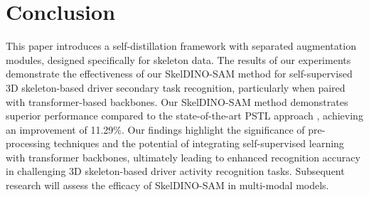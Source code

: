 \section{Conclusion}
This paper introduces a self-distillation framework with separated augmentation modules, designed specifically for skeleton data. The results of our experiments demonstrate the effectiveness of our SkelDINO-SAM method for self-supervised 3D skeleton-based driver secondary task recognition, particularly when paired with transformer-based backbones. Our SkelDINO-SAM method demonstrates superior performance compared to the state-of-the-art PSTL approach \cite{zhou2023self}, achieving an improvement of 11.29\%. Our findings highlight the significance of pre-processing techniques and the potential of integrating self-supervised learning with transformer backbones, ultimately leading to enhanced recognition accuracy in challenging 3D skeleton-based driver activity recognition tasks. Subsequent research will assess the efficacy of SkelDINO-SAM in multi-modal models.

